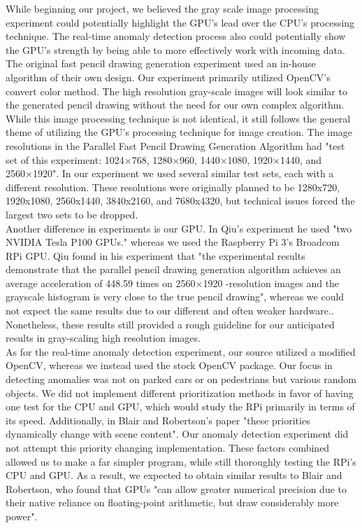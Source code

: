 \documentclass[conference]{IEEEtran}
\begin{document}
While beginning our project, we believed the gray scale image processing experiment could potentially highlight the GPU's lead over the CPU's processing technique. The real-time anomaly detection process also could potentially show the GPU's strength by being able to more effectively work with incoming data. The original fast pencil drawing generation experiment used an in-house algorithm of their own design. Our experiment primarily utilized OpenCV's convert color method. The high resolution gray-scale images will look similar to the generated pencil drawing without the need for our own complex algorithm. While this image processing technique is not identical, it still follows the general theme of utilizing the GPU's processing technique for image creation. The image resolutions in the Parallel Fast Pencil Drawing Generation Algorithm had "test set of this experiment: 1024×768, 1280×960, 1440×1080, 1920×1440, and 2560×1920"\cite{Liu}. In our experiment we used several similar test sets, each with a different resolution. These resolutions were originally planned to be 1280x720, 1920x1080, 2560x1440, 3840x2160, and 7680x4320, but technical issues forced the largest two sets to be dropped. \\
Another difference in experiments is our GPU. In Qiu's experiment he used "two NVIDIA Tesla P100 GPUs." whereas we used the Raspberry Pi 3's Broadcom RPi GPU\cite{Liu}. Qiu found in his experiment that "the experimental results demonstrate that the parallel pencil drawing generation algorithm achieves an average acceleration of 448.59 times on 2560×1920 -resolution images and the grayscale histogram is very close to the true pencil drawing", whereas we could not expect the same results due to our different and often weaker hardware.\cite{Liu}. Nonetheless, these results still provided a rough guideline for our anticipated results in gray-scaling high resolution images.\\
As for the real-time anomaly detection experiment, our source utilized a modified OpenCV, whereas we instead used the stock OpenCV package. Our focus in detecting anomalies was not on parked cars or on pedestrians but various random objects. We did not implement different prioritization methods in favor of having one test for the CPU and GPU, which would study the RPi primarily in terms of its speed. Additionally, in Blair and Robertson's paper "these priorities dynamically change with scene content"\cite{Blair}. Our anomaly detection experiment did not attempt this priority changing implementation. These factors combined allowed us to make a far simpler program, while still thoroughly testing the RPi's CPU and GPU. As a result, we expected to obtain similar results to Blair and Robertson, who found that GPUs "can allow greater numerical precision due to their native reliance on floating-point arithmetic, but draw considerably more power"\cite{Blair}.\\
\end{document}
